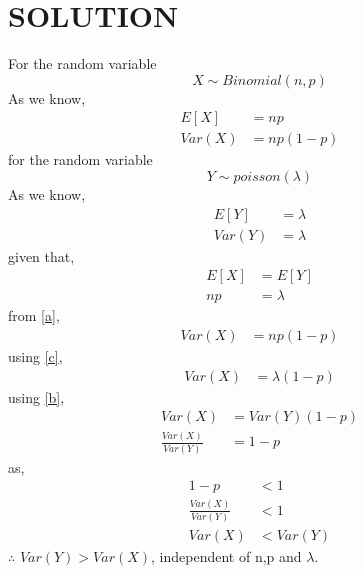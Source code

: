 \documentclass[journal,12pt,twocolumn]{IEEEtran}
\begin{document}
\section{SOLUTION}
For the random variable $$X\sim Binomial(n, p)$$
As we know,
\begin{align}
E[X]&=np\\
Var(X)&=np(1-p) \label{a}
\end{align}
for the random variable $$Y\sim poisson(\lambda)$$
As we know,
\begin{align}
E[Y]&=\lambda\\
Var(Y)&=\lambda \label{b}
\end{align}
given that,
\begin{align}
E[X]&=E[Y]\\
np&=\lambda \label{c}
\end{align}
from \eqref{a},
\begin{align}
Var(X)&=np(1-p)
\end{align}
using \eqref{c},
\begin{align}
Var(X)&=\lambda(1-p)
\end{align}
using \eqref{b},
\begin{align}
Var(X)&=Var(Y)(1-p)\\
\frac{Var(X)}{Var(Y)}&= 1-p
\end{align}
as,
\begin{align}
1-p &<1\\
\frac{Var(X)}{Var(Y)}&<1\\
Var(X) &< Var(Y)
\end{align}
$\therefore$ $Var(Y) >Var(X)$, independent of n,p and $\lambda$.
\end{document}
